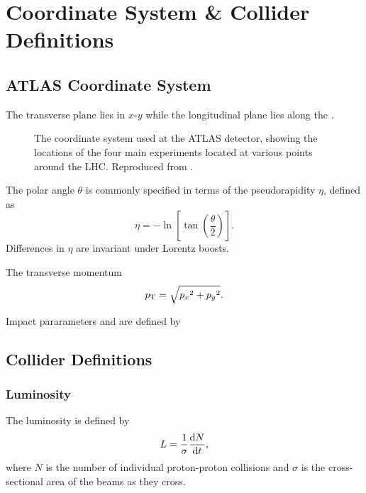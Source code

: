 \section{Coordinate System \& Collider Definitions}

\subsection{ATLAS Coordinate System}

The transverse plane lies in $x$\nobreakdash-$y$ while the longitudinal plane lies along the .
%
\begin{figure}[!htbp]
  \centering
  
  \caption{
    The coordinate system used at the ATLAS detector, showing the locations of the four main experiments located at various points around the LHC.
    Reproduced from .
  }
  \label{fig:atlas_coord_system}
\end{figure}

The polar angle $\theta$ is commonly specified in terms of the pseudorapidity $\eta$, defined as
%
\begin{equation}\label{eq:pseudorap}
  \eta = - \ln \left[ \tan \left( \frac{\theta}{2} \right) \right] .
\end{equation}
%
Differences in $\eta$ are invariant under Lorentz boosts.

The transverse momentum \pt
%
\begin{equation}\label{eq:pt}
  p_{\text{T}} = \sqrt{ {p_x}^2 + {p_y}^2 }.
\end{equation}

Impact pararameters \dzero and \zzero are defined by



\subsection{Collider Definitions}\label{sec:collider_defs}

\subsubsection{Luminosity}
The luminosity is defined by
%
\begin{equation}\label{eq:lumi_def}
L = \frac{1}{\sigma} \frac{\mathrm{d}N}{\mathrm{d}t} ,
\end{equation}
%
where $N$ is the number of individual proton-proton collisions and $\sigma$ is the cross-sectional area of the beams as they cross.

